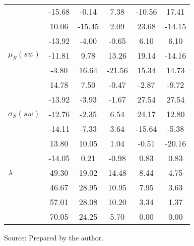 \begin{table}[h!]
\begin{center}
\begin{tabular}{| l || c | c | c | c | c |}
 & -15.68  & -0.14  & 7.38  & -10.56  & 17.41 \\
 & 10.06  & -15.45  & 2.09  & 23.68  & -14.15 \\
 & -13.92  & -4.00  & -0.65  & 6.10  & 6.10 \\\hline
$\mu_S(sw)$ & -11.81  & 9.78  & 13.26  & 19.14  & -14.16 \\
 & -3.80  & 16.64  & -21.56  & 15.34  & 14.73 \\
 & 14.78  & 7.50  & -0.47  & -2.87  & -9.72 \\
 & -13.92  & -3.93  & -1.67  & 27.54  & 27.54 \\\hline
$\sigma_S(sw)$ & -12.76  & -2.35  & 6.54  & 24.17  & 12.80 \\
 & -14.11  & -7.33  & 3.64  & -15.64  & -5.38 \\
 & 13.80  & 10.05  & 1.04  & -0.51  & -20.16 \\
 & -14.05  & 0.21  & -0.98  & 0.83  & 0.83 \\\hline\hline
$\lambda$ & 49.30  & 19.02  & 14.48  & 8.44  & 4.75 \\
 & 46.67  & 28.95  & 10.95  & 7.95  & 3.63 \\
 & 57.01  & 28.08  & 10.20  & 3.34  & 1.37 \\
 & 70.05  & 24.25  & 5.70  & 0.00  & 0.00 \\\hline
\end{tabular}
\begin{flushleft}
		Source: Prepared by the author.\
\end{flushleft}
\end{center}
\end{table}
